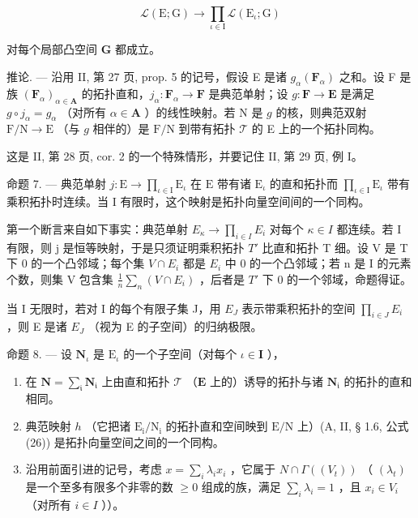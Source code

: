 \[
\mathcal {L} (\mathrm{E}; \mathrm{G}) \rightarrow \prod_ {\iota \in \mathrm{I}} \mathcal {L} (\mathrm{E} _ {\iota}; \mathrm{G})\tag{1}
\]

对每个局部凸空间 \(\mathbf{G}\) 都成立。

推论. --- 沿用 II, 第 27 页, prop. 5 的记号，假设 E 是诸 \(g_{\alpha}(\mathbf{F}_{\alpha})\) 之和。设 F 是族 \((\mathbf{F}_{\alpha})_{\alpha \in \mathbf{A}}\) 的拓扑直和，\(j_{\alpha}: \mathbf{F}_{\alpha} \to \mathbf{F}\) 是典范单射；设 \(g: \mathbf{F} \to \mathbf{E}\) 是满足 \(g \circ j_{\alpha} = g_{\alpha}\) （对所有 \(\alpha \in \mathbf{A}\) ）的线性映射。若 N 是 \(g\) 的核，则典范双射 \(\mathrm{F/N} \to \mathrm{E}\) （与 \(g\) 相伴的）是 \(\mathrm{F/N}\) 到带有拓扑 \(\mathcal{T}\) 的 E 上的一个拓扑同构。

这是 II, 第 28 页, cor. 2 的一个特殊情形，并要记住 II, 第 29 页, 例 I。

命题 7. --- 典范单射 \(j: \mathrm{E} \to \prod_{\iota \in \mathrm{I}} \mathrm{E}_{\iota}\) 在 \(\mathrm{E}\) 带有诸 \(\mathrm{E}_{\iota}\) 的直和拓扑而 \(\prod_{\iota \in \mathrm{I}} \mathrm{E}_{\iota}\) 带有乘积拓扑时连续。当 \(\mathrm{I}\) 有限时，这个映射是拓扑向量空间间的一个同构。

第一个断言来自如下事实：典范单射 \(E_{\kappa} \to \prod_{i \in I} E_{i}\) 对每个 \(\kappa \in I\) 都连续。若 I 有限，则 j 是恒等映射，于是只须证明乘积拓扑 \(T'\) 比直和拓扑 T 细。设 V 是 T 下 0 的一个凸邻域；每个集 \(V \cap E_{i}\) 都是 \(E_{i}\) 中 0 的一个凸邻域；若 n 是 I 的元素个数，则集 V 包含集 \(\frac{1}{n} \sum_{n} (V \cap E_{i})\) ，后者是 \(T'\) 下 0 的一个邻域，命题得证。

当 I 无限时，若对 I 的每个有限子集 J，用 \(E_{J}\) 表示带乘积拓扑的空间 \(\prod_{i\in J}E_{i}\) ，则 E 是诸 \(E_{J}\) （视为 E 的子空间）的归纳极限。

命题 8. --- 设 \(\mathbf{N}_{\iota}\) 是 \(\mathrm{E}_{\iota}\) 的一个子空间（对每个 \(\iota \in \mathbf{I}\) ），

\begin{enumerate}
\def\labelenumi{(\roman{enumi})}
\item
  在 \(\mathbf{N} = \sum_{\mathfrak{i}}\mathbf{N}_{\mathfrak{i}}\) 上由直和拓扑 \(\mathcal{T}\) （\(\mathbf{E}\) 上的）诱导的拓扑与诸 \(\mathbf{N}_{\mathfrak{i}}\) 的拓扑的直和相同。
\item
  典范映射 \(h\) （它把诸 \(\mathrm{E}_{\mathrm{i}} / \mathrm{N}_{\mathrm{i}}\) 的拓扑直和空间映到 \(\mathrm{E} / \mathrm{N}\) 上）(A, II, § 1.6, 公式 (26)) 是拓扑向量空间之间的一个同构。
\item
  沿用前面引进的记号，考虑 \(x = \sum_{i} \lambda_i x_i\) ，它属于 \(N \cap \Gamma((V_{t}))\) （ \((\lambda_{t})\) 是一个至多有限多个非零的数 \(\geqslant 0\) 组成的族，满足 \(\sum_{i} \lambda_{i} = 1\) ，且 \(x_{i} \in V_{i}\) （对所有 \(i \in I\) ））。
\end{enumerate}

